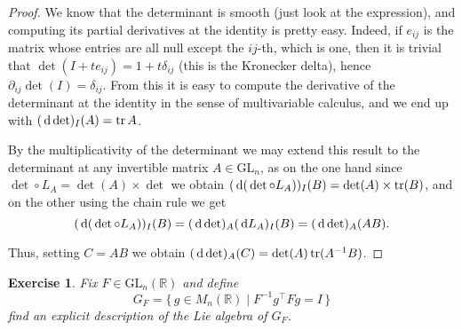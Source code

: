 \documentclass{article}
\newtheorem{ex}{Exercise}
\theoremstyle{nonumberplain}
\newtheorem{proof}{Proof}
\newcommand{\R}{\mathbb{R}}
\DeclareMathOperator{\trace}{tr}
\newcommand{\transpose}{\top}
\newcommand{\GL}{\mathrm{GL}}
\begin{document}
\begin{proof}
We know that the determinant is smooth (just look at the expression), and computing its partial derivatives at the identity is pretty easy. Indeed, if $e_{ij}$ is the matrix whose entries are all null except the $ij$-th, which is one, then it is trivial that $\det(I + t e_{ij}) = 1 + t \delta_{ij}$ (this is the Kronecker delta), hence $\partial_{ij} \det(I) = \delta_{ij}$. From this it is easy to compute the derivative of the determinant at the identity in the sense of multivariable calculus, and we end up with $(\dl \det)_I(A) = \trace A$.

By the multiplicativity of the determinant we may extend this result to the determinant at any invertible matrix $A \in \GL_n$, as on the one hand since $\det \circ L_A = \det(A) \times \det$ we obtain $(\dl (\det \circ L_A))_I(B) = \det(A) \times \trace(B)$, and on the other using the chain rule we get
\begin{equation}
(\dl (\det \circ L_A))_I(B) = (\dl \det)_A (\dl L_A)_I (B) = (\dl \det)_A (AB).
\end{equation}

Thus, setting $C = AB$ we obtain $(\dl \det)_A(C) = \det(A) \trace(A^{-1} B)$.
\end{proof}

\pagebreak

\begin{ex}
Fix $F \in \GL_n(\R)$ and define
\begin{equation}
G_F = \{\, g \in M_n(\R) \mid F^{-1} g^\transpose F g = I \,\}
\end{equation}
find an explicit description of the Lie algebra of $G_F$.
\end{ex}
\end{document}
